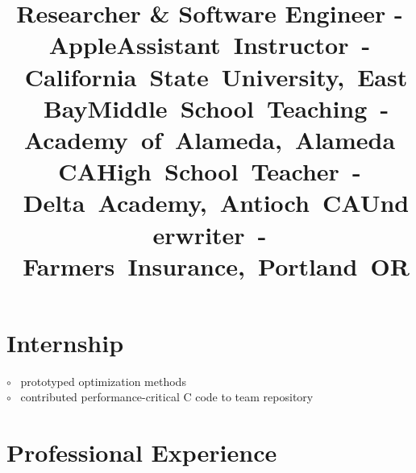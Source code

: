 \documentclass[12pt,margintitle,line]{res}
\newcommand{\CC}{C\nolinebreak\hspace{-.05em}\raisebox{.4ex}{\scriptsize\bf +}\nolinebreak\hspace{-.10em}\raisebox{.4ex}{\scriptsize\bf +} }
\def\CC{{C\nolinebreak[4]\hspace{-.05em}\raisebox{.4ex}{\scriptsize\bf ++}}}
\begin{document}
\begin{resume}


\vspace{-1.3cm}

\section{Internship}

\vspace{-0.5cm}
\title{Researcher \& Software Engineer - Apple}
\dates{}
\begin{position}
$\circ$ \ prototyped optimization methods \\
$\circ$ \ contributed performance-critical \CC \hspace{-0.02cm} code to team repository 
\end{position}



\vspace{-0.2cm}

\section{Professional Experience}

\vspace{-0.5cm}
\title{\mbox{Assistant Instructor - California State University, East Bay}}
\dates{}
\begin{position}
\end{position}


\vspace{-1.8cm}
\title{\mbox{Middle School Teaching - Academy of Alameda, Alameda CA}}
\dates{}
\begin{position}
\end{position}

\vspace{-1.8cm}
\title{\mbox{High School Teacher - Delta Academy, Antioch CA}}
\dates{}
\begin{position}
\end{position}

\vspace{-1.8cm}
\title{\mbox{Underwriter - Farmers Insurance, Portland OR}}
\dates{}
\begin{position}
\end{position}





\end{resume}
\end{document}
